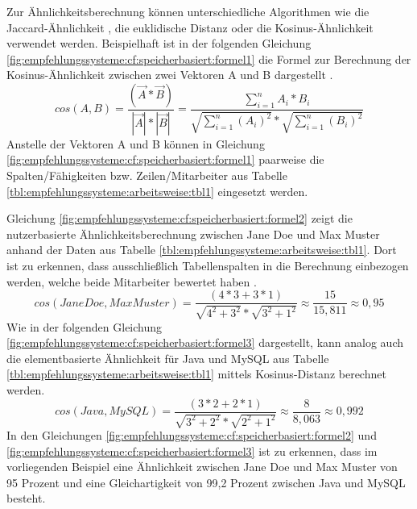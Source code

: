 Zur Ähnlichkeitsberechnung können unterschiedliche Algorithmen wie die Jaccard-Ähnlichkeit \cite[S. 2]{bharti:2019}, die euklidische Distanz \cite[S. 3]{cheng:2013} oder die Kosinus-Ähnlichkeit \cite[S. 2]{duong:2018} verwendet werden. Beispielhaft ist in der folgenden Gleichung \ref{fig:empfehlungssysteme:cf:speicherbasiert:formel1} die Formel zur Berechnung der Kosinus-Ähnlichkeit zwischen zwei Vektoren A und B dargestellt \cite[S. 111]{bharti:2019}.
\begin{equation}
cos(A,B) = \frac{(\vec{A} * \vec{B})}{|\vec{A}| * |\vec{B}|} = \frac{\sum_{i=1}^n A_i * B_i}{\sqrt{\sum_{i=1}^n (A_i)^2} * \sqrt{\sum_{i=1}^n (B_i)^2}}
\label{fig:empfehlungssysteme:cf:speicherbasiert:formel1}
\end{equation}
Anstelle der Vektoren A und B können in Gleichung \ref{fig:empfehlungssysteme:cf:speicherbasiert:formel1} paarweise die Spalten/Fähigkeiten bzw. Zeilen/Mitarbeiter aus Tabelle \ref{tbl:empfehlungssysteme:arbeitsweise:tbl1} eingesetzt werden.

Gleichung \ref{fig:empfehlungssysteme:cf:speicherbasiert:formel2} zeigt die nutzerbasierte Ähnlichkeitsberechnung zwischen Jane Doe und Max Muster anhand der Daten aus Tabelle \ref{tbl:empfehlungssysteme:arbeitsweise:tbl1}. Dort ist zu erkennen, dass ausschließlich Tabellenspalten in die Berechnung einbezogen werden, welche beide Mitarbeiter bewertet haben \cite[S. 2f.]{hao:2013}.
\begin{equation}
	cos(Jane Doe,Max Muster) = \frac{(4*3 + 3*1)}{\sqrt{4^2 + 3^2} * \sqrt{3^2 + 1^2}} \approx \frac{15}{15,811} \approx 0,95
	\label{fig:empfehlungssysteme:cf:speicherbasiert:formel2}
\end{equation}
Wie in der folgenden Gleichung \ref{fig:empfehlungssysteme:cf:speicherbasiert:formel3} dargestellt, kann analog auch die elementbasierte Ähnlichkeit für Java und MySQL aus Tabelle \ref{tbl:empfehlungssysteme:arbeitsweise:tbl1} mittels Kosinus-Distanz berechnet werden.
\begin{equation}
	cos(Java, MySQL) = \frac{(3*2 + 2*1)}{\sqrt{3^2 + 2^2} * \sqrt{2^2 + 1^2}} \approx \frac{8}{8,063} \approx 0,992
	\label{fig:empfehlungssysteme:cf:speicherbasiert:formel3}
\end{equation}
In den Gleichungen \ref{fig:empfehlungssysteme:cf:speicherbasiert:formel2} und \ref{fig:empfehlungssysteme:cf:speicherbasiert:formel3} ist zu erkennen, dass im vorliegenden Beispiel eine Ähnlichkeit zwischen Jane Doe und Max Muster von 95 Prozent und eine Gleichartigkeit von 99,2 Prozent zwischen Java und MySQL besteht.%


